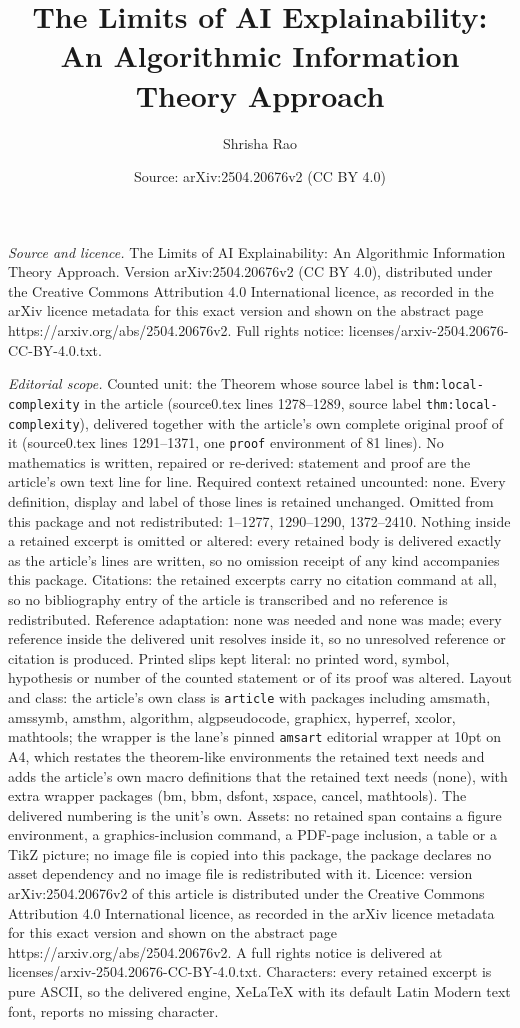 \documentclass[10pt,a4paper]{amsart}
\title[The Limits of AI Explainability: An Algorithmic Information ]{The Limits of AI Explainability: An Algorithmic Information Theory Approach}
\author{Shrisha Rao}
\date{Source: arXiv:2504.20676v2 (CC BY 4.0)}
\begin{document}
\maketitle

\noindent\emph{Source and licence.} The Limits of AI Explainability: An Algorithmic Information Theory Approach. Version arXiv:2504.20676v2 (CC BY 4.0), distributed under the Creative Commons Attribution 4.0 International licence, as recorded in the arXiv licence metadata for this exact version and shown on the abstract page https://arxiv.org/abs/2504.20676v2. Full rights notice: licenses/arxiv-2504.20676-CC-BY-4.0.txt.\par\smallskip

\noindent\textit{Editorial scope.} Counted unit: the Theorem whose source label is \texttt{thm:local-complexity} in the article (source0.tex lines 1278--1289, source label \texttt{thm:local-complexity}), delivered together with the article's own complete original proof of it (source0.tex lines 1291--1371, one \texttt{proof} environment of 81 lines). No mathematics is written, repaired or re-derived: statement and proof are the article's own text line for line. Required context retained uncounted: none. Every definition, display and label of those lines is retained unchanged. Omitted from this package and not redistributed: 1--1277, 1290--1290, 1372--2410. Nothing inside a retained excerpt is omitted or altered: every retained body is delivered exactly as the article's lines are written, so no omission receipt of any kind accompanies this package. Citations: the retained excerpts carry no citation command at all, so no bibliography entry of the article is transcribed and no reference is redistributed. Reference adaptation: none was needed and none was made; every reference inside the delivered unit resolves inside it, so no unresolved reference or citation is produced. Printed slips kept literal: no printed word, symbol, hypothesis or number of the counted statement or of its proof was altered. Layout and class: the article's own class is \texttt{article} with packages including amsmath, amssymb, amsthm, algorithm, algpseudocode, graphicx, hyperref, xcolor, mathtools; the wrapper is the lane's pinned \texttt{amsart} editorial wrapper at 10pt on A4, which restates the theorem-like environments the retained text needs and adds the article's own macro definitions that the retained text needs (none), with extra wrapper packages (bm, bbm, dsfont, xspace, cancel, mathtools). The delivered numbering is the unit's own. Assets: no retained span contains a figure environment, a graphics-inclusion command, a PDF-page inclusion, a table or a TikZ picture; no image file is copied into this package, the package declares no asset dependency and no image file is redistributed with it. Licence: version arXiv:2504.20676v2 of this article is distributed under the Creative Commons Attribution 4.0 International licence, as recorded in the arXiv licence metadata for this exact version and shown on the abstract page https://arxiv.org/abs/2504.20676v2. A full rights notice is delivered at licenses/arxiv-2504.20676-CC-BY-4.0.txt. Characters: every retained excerpt is pure ASCII, so the delivered engine, XeLaTeX with its default Latin Modern text font, reports no missing character.
\end{document}
